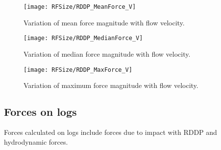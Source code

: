 \begin{figure}
\centering
\texttt{[image: RFSize/RDDP\_MeanForce\_V]}
\caption{\label{fig:RDDP_MeanForce_V}Variation of mean force magnitude with flow velocity.}
\end{figure}
\begin{figure}
\centering
\texttt{[image: RFSize/RDDP\_MedianForce\_V]}
\caption{\label{fig:RDDP_MedianForce_V}Variation of median force magnitude with flow velocity.}
\end{figure}
\begin{figure}
\centering
\texttt{[image: RFSize/RDDP\_MaxForce\_V]}
\caption{\label{fig:RDDP_MaxForce_V}Variation of maximum force magnitude with flow velocity.}
\end{figure}

\subsection{Forces on logs}
Forces calculated on logs include forces due to impact with RDDP and hydrodynamic forces. 